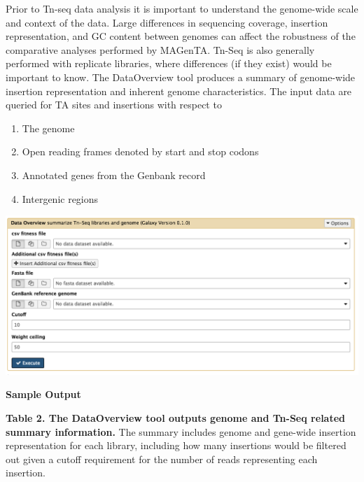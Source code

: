 \documentclass[11pt,]{article}
\providecommand{\tightlist}{%
  \setlength{\itemsep}{0pt}\setlength{\parskip}{0pt}}
\begin{document}
Prior to Tn-seq data analysis it is important to understand the
genome-wide scale and context of the data. Large differences in
sequencing coverage, insertion representation, and GC content between
genomes can affect the robustness of the comparative analyses performed
by MAGenTA. Tn-Seq is also generally performed with replicate libraries,
where differences (if they exist) would be important to know. The
DataOverview tool produces a summary of genome-wide insertion
representation and inherent genome characteristics. The input data are
queried for TA sites and insertions with respect to

\begin{enumerate}
\def\labelenumi{\arabic{enumi}.}
\tightlist
\item
  The genome
\item
  Open reading frames denoted by start and stop codons
\item
  Annotated genes from the Genbank record
\item
  Intergenic regions
\end{enumerate}

\centerline{\includegraphics[width=0.8\linewidth]{figs/dataOverview_galaxy.png}}

\textbf{Sample Output}

\textbf{Table 2. The DataOverview tool outputs genome and Tn-Seq related
summary information.} The summary includes genome and gene-wide
insertion representation for each library, including how many insertions
would be filtered out given a cutoff requirement for the number of reads
representing each insertion.
\end{document}
